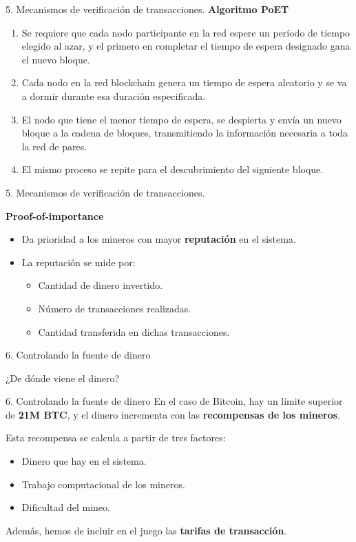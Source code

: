 \documentclass[10pt, xcolor=table]{beamer}
\begin{document}
\begin{frame}{5. Mecanismos de verificación de transacciones. }
\textbf{Algoritmo PoET}
\begin{enumerate}
\item Se requiere que cada nodo participante en la red espere un período de tiempo elegido al azar, y el primero en completar el tiempo de espera designado gana el nuevo bloque.
\item
  Cada nodo en la red blockchain genera un tiempo de espera aleatorio y se va a dormir durante esa duración especificada.
\item
	El nodo que tiene el menor tiempo de espera, se despierta y envía un nuevo bloque a la cadena de bloques, transmitiendo la información necesaria a toda la red de pares.
\item
  El mismo proceso se repite para el descubrimiento del siguiente bloque.
\end{enumerate}
\end{frame}

\begin{frame}{5. Mecanismos de verificación de transacciones. }
\begin{center}
	\large{\textbf{Proof-of-importance}}
\end{center}
\begin{itemize}
	\item Da prioridad a los mineros con mayor \textbf{reputación} en el sistema.
	\item La reputación se mide por:
	\begin{itemize}
		\item Cantidad de dinero invertido.
		\item Número de transacciones realizadas.
		\item Cantidad transferida en dichas transacciones.
\end{itemize}
\end{itemize}
\end{frame}

\begin{frame}{6. Controlando la fuente de dinero}
\begin{center}
	\huge{¿De dónde viene el dinero?}
\end{center}	
\end{frame}


\begin{frame}{6. Controlando la fuente de dinero}
En el caso de Bitcoin, hay un límite superior de \textbf{21M BTC}, y el dinero incrementa con las \textbf{recompensas de los mineros}.

Esta recompensa se calcula a partir de tres factores:
\begin{itemize}
	\item Dinero que hay en el sistema.
	\item Trabajo computacional de los mineros.
	\item Dificultad del mineo.
\end{itemize}

Además, hemos de incluir en el juego las \textbf{tarifas de transacción}.
\end{frame}
\end{document}
